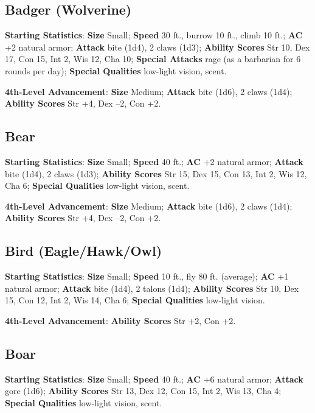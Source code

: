 \subsection{Badger (Wolverine)}

				
\textbf{Starting Statistics}:\textbf{ Size} Small; \textbf{Speed} 30 ft., burrow 10 ft., climb 10 ft.; \textbf{AC} +2 natural armor; \textbf{Attack} bite (1d4), 2 claws (1d3); \textbf{Ability Scores }Str 10, Dex 17, Con 15, Int 2, Wis 12, Cha 10; \textbf{Special Attacks }rage (as a barbarian for 6 rounds per day); \textbf{Special Qualities} low-light vision, scent.
				
\textbf{4th-Level Advancement}: \textbf{Size }Medium; \textbf{Attack }bite (1d6), 2 claws (1d4); \textbf{Ability Scores }Str +4, Dex --2, Con +2. 
				
\subsection{Bear}

				
\textbf{Starting Statistics}:\textbf{ Size} Small; \textbf{Speed} 40 ft.; \textbf{AC} +2 natural armor; \textbf{Attack} bite (1d4), 2 claws (1d3); \textbf{Ability Scores }Str 15, Dex 15, Con 13, Int 2, Wis 12, Cha 6; \textbf{Special Qualities} low-light vision, scent.
				
\textbf{4th-Level Advancement}: \textbf{Size }Medium; \textbf{Attack} bite (1d6), 2 claws (1d4); \textbf{Ability Scores }Str +4, Dex --2, Con +2. 
				
\subsection{Bird (Eagle/Hawk/Owl)}

				
\textbf{Starting Statistics}:\textbf{ Size} Small; \textbf{Speed} 10 ft., fly 80 ft. (average); \textbf{AC} +1 natural armor; \textbf{Attack} bite (1d4), 2 talons (1d4); \textbf{Ability Scores }Str 10, Dex 15, Con 12, Int 2, Wis 14, Cha 6; \textbf{Special Qualities} low-light vision.
				
\textbf{4th-Level Advancement}: \textbf{Ability Scores} Str +2, Con +2.
				
\subsection{Boar}

				
\textbf{Starting Statistics}:\textbf{ Size} Small; \textbf{Speed} 40 ft.; \textbf{AC} +6 natural armor; \textbf{Attack} gore (1d6); \textbf{Ability Scores }Str 13, Dex 12, Con 15, Int 2, Wis 13, Cha 4; \textbf{Special Qualities} low-light vision, scent.
				
